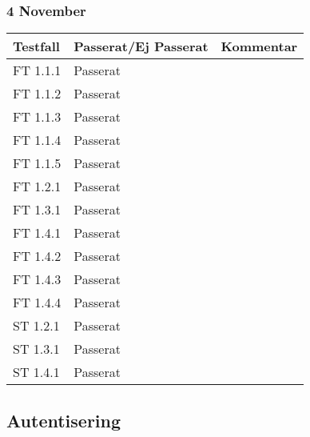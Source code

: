 \documentclass[a4paper]{article}
\begin{document}
\subsubsection{4 November}
\begin{tabular}{| l | l | p{9cm} |}
\hline
Testfall & Passerat/Ej Passerat & Kommentar\\
\hline
FT 1.1.1 & Passerat & \\
\hline
FT 1.1.2 & Passerat & \\
\hline
FT 1.1.3 & Passerat & \\
\hline
FT 1.1.4 & Passerat & \\
\hline
FT 1.1.5 & Passerat & \\
\hline
FT 1.2.1 & Passerat & \\
\hline
FT 1.3.1 & Passerat & \\
\hline
FT 1.4.1 & Passerat & \\
\hline
FT 1.4.2 & Passerat & \\
\hline
FT 1.4.3 & Passerat & \\
\hline
FT 1.4.4 & Passerat & \\
\hline
ST 1.2.1 & Passerat & \\
\hline
ST 1.3.1 & Passerat & \\
\hline
ST 1.4.1 & Passerat & \\
\hline
\end{tabular}







\subsection{Autentisering}
\end{document}
